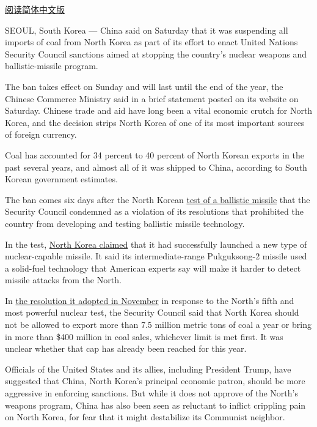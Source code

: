 \href{http://cn.nytimes.com/china/20170220/north-korea-china-coal-imports-suspended/}{阅读简体中文版}

SEOUL, South Korea --- China said on Saturday that it was suspending all
imports of coal from North Korea as part of its effort to enact United
Nations Security Council sanctions aimed at stopping the country's
nuclear weapons and ballistic-missile program.

The ban takes effect on Sunday and will last until the end of the year,
the Chinese Commerce Ministry said in a brief statement posted on its
website on Saturday. Chinese trade and aid have long been a vital
economic crutch for North Korea, and the decision strips North Korea of
one of its most important sources of foreign currency.

Coal has accounted for 34 percent to 40 percent of North Korean exports
in the past several years, and almost all of it was shipped to China,
according to South Korean government estimates.

The ban comes six days after the North Korean
\href{https://www.nytimes.com/2017/02/11/world/asia/north-korea-missile-test-trump.html}{test
of a ballistic missile} that the Security Council condemned as a
violation of its resolutions that prohibited the country from developing
and testing ballistic missile technology.

In the test,
\href{https://www.nytimes.com/2017/02/13/world/asia/north-korea-missile-launch-success.html}{North
Korea claimed} that it had successfully launched a new type of
nuclear-capable missile. It said its intermediate-range Pukguksong-2
missile used a solid-fuel technology that American experts say will make
it harder to detect missile attacks from the North.

In
\href{https://www.nytimes.com/2016/11/30/world/asia/north-korea-un-sanctions.html?_r=0}{the
resolution it adopted in November} in response to the North's fifth and
most powerful nuclear test, the Security Council said that North Korea
should not be allowed to export more than 7.5 million metric tons of
coal a year or bring in more than \$400 million in coal sales, whichever
limit is met first. It was unclear whether that cap has already been
reached for this year.

Officials of the United States and its allies, including President
Trump, have suggested that China, North Korea's principal economic
patron, should be more aggressive in enforcing sanctions. But while it
does not approve of the North's weapons program, China has also been
seen as reluctant to inflict crippling pain on North Korea, for fear
that it might destabilize its Communist neighbor.

